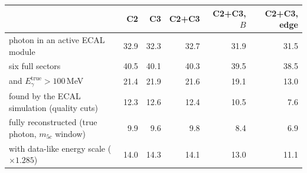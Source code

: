 \begin{tabular}{@{}l r r r r r@{}}
\toprule
 & C2 & C3 & C2+C3 & C2+C3, $B$ & C2+C3, edge \\
\midrule
photon in an active ECAL module & 32.9 & 32.3 & 32.7 & 31.9 & 31.5 \\
\quad six full sectors & 40.5 & 40.1 & 40.3 & 39.5 & 38.5 \\
\quad and $E_\gamma^{\mathrm{true}}>100$\,MeV & 21.4 & 21.9 & 21.6 & 19.1 & 13.0 \\
found by the ECAL simulation (quality cuts) & 12.3 & 12.6 & 12.4 & 10.5 & 7.6 \\
fully reconstructed (true photon, $m_{5c}$ window) & 9.9 & 9.6 & 9.8 & 8.4 & 6.9 \\
\quad with data-like energy scale ($\times1.285$) & 14.0 & 14.3 & 14.1 & 13.0 & 11.1 \\
\bottomrule
\end{tabular}
